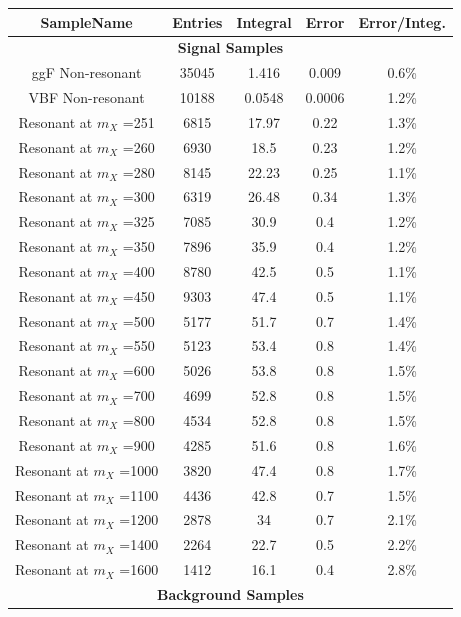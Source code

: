 \begin{table}
  \centering
  \scriptsize
  \begin{tabular}{|c|c|c|c|c|}

\hline
\hline
SampleName & Entries & Integral & Error & Error/Integ.\\
\hline
\multicolumn{5}{|c|}{\textbf{Signal Samples}} \\
\hline
ggF Non-resonant            &35045	& 1.416  &  0.009 & 0.6\%\\	
VBF Non-resonant	   	      &10188  & 0.0548  &  0.0006 &1.2\% \\
Resonant at $m_X$ =251      & 6815	& 17.97  &  0.22  & 1.3\% \\
Resonant at $m_X$ =260      & 6930	& 18.5  &  0.23  & 1.2\% \\
Resonant at $m_X$ =280      & 8145	& 22.23  &  0.25  & 1.1\% \\
Resonant at $m_X$ =300      & 6319 	& 26.48  &  0.34   & 	1.3\% \\
Resonant at $m_X$ =325      & 7085 	& 30.9  &  0.4   & 	1.2\% \\
Resonant at $m_X$ =350      & 7896 	& 35.9  &  0.4   & 	1.2\% \\
Resonant at $m_X$ =400      & 8780 	& 42.5  &  0.5   & 	1.1\% \\
Resonant at $m_X$ =450      & 9303 	& 47.4  &  0.5  &  	1.1\% \\
Resonant at $m_X$ =500      & 5177 	& 51.7  &  0.7 & 	1.4\% \\
Resonant at $m_X$ =550      & 5123 	& 53.4  &  0.8 & 	1.4\% \\
Resonant at $m_X$ =600      & 5026 	& 53.8  &  0.8& 	1.5\% \\
Resonant at $m_X$ =700      &	4699	& 52.8  &  0.8& 	1.5\% \\
Resonant at $m_X$ =800      &	4534	& 52.8  &  0.8& 	1.5\% \\
Resonant at $m_X$ =900      &	4285	& 51.6  &  0.8& 	1.6\% \\
Resonant at $m_X$ =1000     &	3820	& 47.4  &  0.8& 	1.7\% \\
Resonant at $m_X$ =1100     &	4436	& 42.8  &  0.7& 	1.5\% \\
Resonant at $m_X$ =1200     &	2878	& 34  &  0.7& 	2.1\%\\	
Resonant at $m_X$ =1400     &	2264	& 22.7  &  0.5& 	2.2\% \\
Resonant at $m_X$ =1600     &	1412	& 16.1  &  0.4& 	2.8\% \\
\hline
\multicolumn{5}{|c|}{\textbf{Background Samples}} \\

\end{tabular}
\end{table}

